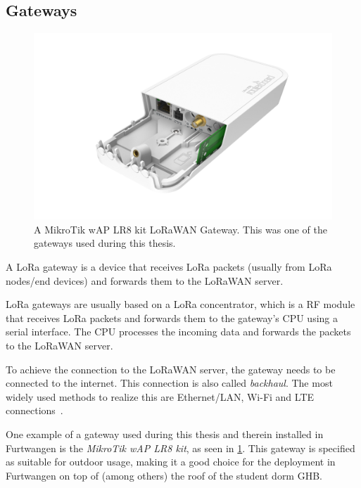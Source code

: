 \subsection{Gateways}

\begin{figure}[htbp]
    \centering
    \includegraphics[width=.6\textwidth]{pictures/hardware/gateways/mikrotik-lr8-kit.png}
    \caption{
        A MikroTik wAP LR8 kit \ac{LoRaWAN} Gateway.
        This was one of the gateways used during this thesis.~\protect\cite{the_things_industries_bv_lorawan_nodate}
    }\label{pic:mikrotik-lr8-kit-gateway}
\end{figure}

A \ac{LoRa} gateway is a device that receives \ac{LoRa} packets (usually from \ac{LoRa} nodes/end devices) and forwards them to the \ac{LoRaWAN} server.

\ac{LoRa} gateways are usually based on a \ac{LoRa} concentrator, which is a \ac{RF} module that receives \ac{LoRa} packets and forwards them to the gateway's \ac{CPU} using a serial interface.
The \ac{CPU} processes the incoming data and forwards the packets to the \ac{LoRaWAN} server.

To achieve the connection to the \ac{LoRaWAN} server, the gateway needs to be connected to the internet.
This connection is also called \emph{backhaul}.
The most widely used methods to realize this are Ethernet/\ac{LAN}, Wi-Fi and \ac{LTE} connections~\cite{the_things_industries_bv_lorawan_nodate}.

One example of a gateway used during this thesis and therein installed in Furtwangen is the \emph{MikroTik wAP LR8 kit}, as seen in \cref{pic:mikrotik-lr8-kit-gateway}.
This gateway is specified as suitable for outdoor usage, making it a good choice for the deployment in Furtwangen on top of (among others) the roof of the student dorm \ac{GHB}.


